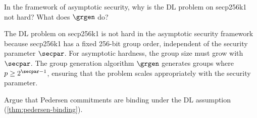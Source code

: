 \begin{exercise}
  In the framework of asymptotic security, why is the DL problem on secp256k1 not hard? What does $\grgen$ do?
\end{exercise}

\ifsolutions
\begin{mysolution}
  The DL problem on secp256k1 is not hard in the asymptotic security framework because secp256k1 has a fixed 256-bit group order, independent of the security parameter $\secpar$.
  For asymptotic hardness, the group size must grow with $\secpar$.
  The group generation algorithm $\grgen$ generates groups where $p \geq 2^{\secpar-1}$, ensuring that the problem scales appropriately with the security parameter.
\end{mysolution}
\fi

\begin{exercise}\label{ex:pedersen-binding}
  Argue that Pedersen commitments are binding under the DL assumption (\autoref{thm:pedersen-binding}).
\end{exercise}

